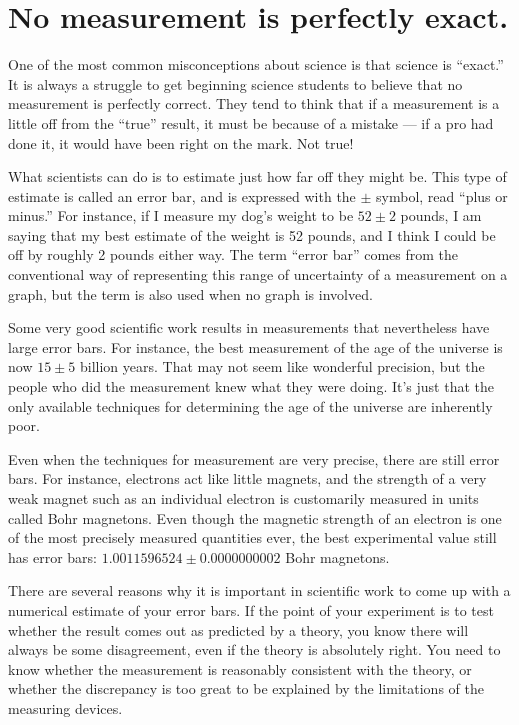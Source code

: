
\section*{No measurement is perfectly exact.}

One of the most common misconceptions about science is that
science is ``exact.'' It is always a struggle to get
beginning science students to believe that no measurement is
perfectly correct. They tend to think that if a measurement
is a little off from the ``true'' result, it must be because
of a mistake --- if a pro had done it, it would have been
right on the mark. Not true!

What scientists can do is to estimate just how far off they
might be. This type of estimate is called an error bar, and
is expressed with the $\pm$ symbol, read ``plus or minus.'' For
instance, if I measure my dog's weight to be $52\pm2$ pounds,
I am saying that my best estimate of the weight is 52
pounds, and I think I could be off by roughly 2 pounds
either way. The term ``error bar'' comes from the conventional
way of representing this range of uncertainty of a
measurement on a graph, but the term is also used when
no graph is involved.

Some very good scientific work results in measurements that
nevertheless have large error bars. For instance, the best
measurement of the age of the universe is now $15\pm5$ billion
years. That may not seem like wonderful precision, but the
people who did the measurement knew what they were doing.
It's just that the only available techniques for determining
the age of the universe are inherently poor.

Even when the techniques for measurement are very precise,
there are still error bars. For instance, electrons act like
little magnets, and the strength of a very weak magnet such
as an individual electron is customarily measured in units
called Bohr magnetons. Even though the magnetic strength of
an electron is one of the most precisely measured quantities
ever, the best experimental value still has error bars:
$1.0011596524\pm0.0000000002$ Bohr magnetons.

There are several reasons why it is important in scientific
work to come up with a numerical estimate of your error
bars. If the point of your experiment is to test whether the
result comes out as predicted by a theory, you know there
will always be some disagreement, even if the theory is
absolutely right. You need to know whether the measurement
is reasonably consistent with the theory, or whether the
discrepancy is too great to be explained by the limitations
of the measuring devices.

